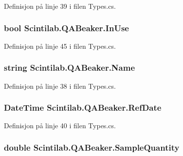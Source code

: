 Definisjon på linje 39 i filen Types.\+cs.

\hypertarget{class_scintilab_1_1_q_a_beaker_ab9e60a2388f98a2dd836a8242b2b5d0d}{
\subsubsection[{In\+Use}]{\setlength{\rightskip}{0pt plus 5cm}bool Scintilab.\+Q\+A\+Beaker.\+In\+Use}}\label{class_scintilab_1_1_q_a_beaker_ab9e60a2388f98a2dd836a8242b2b5d0d}


Definisjon på linje 45 i filen Types.\+cs.

\hypertarget{class_scintilab_1_1_q_a_beaker_a4c861b979110028997c65fd9b66b74b0}{
\subsubsection[{Name}]{\setlength{\rightskip}{0pt plus 5cm}string Scintilab.\+Q\+A\+Beaker.\+Name}}\label{class_scintilab_1_1_q_a_beaker_a4c861b979110028997c65fd9b66b74b0}


Definisjon på linje 38 i filen Types.\+cs.

\hypertarget{class_scintilab_1_1_q_a_beaker_a01e931ad4f82802f249bc3c7e0ad6e70}{
\subsubsection[{Ref\+Date}]{\setlength{\rightskip}{0pt plus 5cm}Date\+Time Scintilab.\+Q\+A\+Beaker.\+Ref\+Date}}\label{class_scintilab_1_1_q_a_beaker_a01e931ad4f82802f249bc3c7e0ad6e70}


Definisjon på linje 40 i filen Types.\+cs.

\hypertarget{class_scintilab_1_1_q_a_beaker_a107adf07288296cf83dc2bfc5def9284}{
\subsubsection[{Sample\+Quantity}]{\setlength{\rightskip}{0pt plus 5cm}double Scintilab.\+Q\+A\+Beaker.\+Sample\+Quantity}}\label{class_scintilab_1_1_q_a_beaker_a107adf07288296cf83dc2bfc5def9284}


